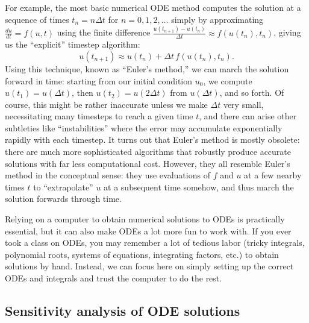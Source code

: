 For example, the most basic numerical ODE method computes the solution
at a sequence of times $t_{n}=n\Delta t$ for $n=0,1,2,\ldots$ simply
by approximating $\frac{du}{dt}=f(u,t)$ using the finite difference
$\frac{u(t_{n+1})-u(t_{n})}{\Delta t}\approx f(u(t_{n}),t_{n})$,
giving us the ``explicit'' timestep algorithm:
\[
u(t_{n+1})\approx u(t_{n})+\Delta t\,f(u(t_{n}),t_{n}).
\]
Using this technique, known as ``Euler's method,'' we can march
the solution forward in time: starting from our initial condition
$u_{0}$, we compute $u(t_1) = u(\Delta t)$, then $u(t_2) = u(2\Delta t)$ from $u(\Delta t)$, and so
forth. Of course, this might be rather inaccurate unless we make $\Delta t$
very small, necessitating many timesteps to reach a given time $t$,
and there can arise other subtleties like ``instabilities'' where the
error may accumulate exponentially rapidly with each timestep. It turns
out that Euler's method is mostly obsolete: there are much more sophisticated algorithms that robustly produce accurate solutions with far less
computational cost. However, they all resemble Euler's method in the
conceptual sense: they use evaluations of $f$ and $u$ at a few nearby
times $t$ to ``extrapolate'' $u$ at a subsequent time somehow, and
thus march the solution forwards through time.

Relying on a computer to obtain numerical solutions to ODEs is practically essential, but it can also make ODEs a lot more fun to work with.  If you ever took a class on ODEs, you may remember a lot of tedious labor (tricky integrals, polynomial roots, systems of equations, integrating factors, etc.) to obtain solutions by hand.  Instead, we can focus here on simply setting up the correct ODEs and integrals and trust the computer to do the rest.

\subsection{Sensitivity analysis of ODE solutions}
\label{sec:ODE-sensitivity}


